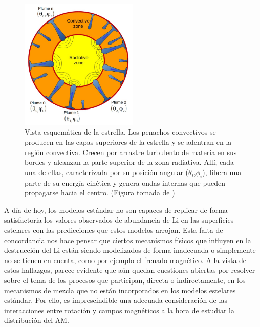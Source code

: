 \begin{figure}
    \centering
    \includegraphics[width=0.5\textwidth]{img/tesis/gravitational_waves.jpg}
    \caption{Vista esquemática de la estrella. Los penachos convectivos se producen en las capas superiores de la estrella y se adentran en la región convectiva. Crecen por arrastre turbulento de materia en sus bordes y alcanzan la parte superior de la zona radiativa. Allí, cada una de ellas, caracterizada por su posición angular ($\theta_i$,$\phi_i$), libera una parte de su energía cinética y genera ondas internas que pueden propagarse hacia el centro. (Figura tomada de \cite{Pincon2016})}
    \label{fig:grav_waves}
\end{figure}

A día de hoy, los modelos estándar no son capaces de replicar de forma satisfactoria los valores observados de abundancia de Li en las superficies estelares con las predicciones que estos modelos arrojan. Esta falta de concordancia nos hace pensar que ciertos mecanismos físicos que influyen en la destrucción del Li están siendo modelizados de forma inadecuada o simplemente no se tienen en cuenta, como por ejemplo el frenado magnético. A la vista de estos hallazgos, parece evidente que aún quedan cuestiones abiertas por resolver sobre el tema de los procesos que participan, directa o indirectamente, en los mecanismos de mezcla que no están incorporados en los modelos estelares estándar. Por ello, es imprescindible una adecuada consideración de las interacciones entre rotación y campos magnéticos a la hora de estudiar la distribución del AM. \par

